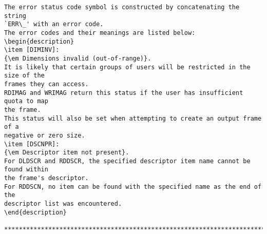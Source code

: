 \begin{verbatim}
The error status code symbol is constructed by concatenating the string
`ERR\_' with an error code.
The error codes and their meanings are listed below:
\begin{description}
\item [DIMINV]:
{\em Dimensions invalid (out-of-range)}.
It is likely that certain groups of users will be restricted in the size of the
frames they can access.
RDIMAG and WRIMAG return this status if the user has insufficient quota to map
the frame.
This status will also be set when attempting to create an output frame of a
negative or zero size.
\item [DSCNPR]:
{\em Descriptor item not present}.
For DLDSCR and RDDSCR, the specified descriptor item name cannot be found within
the frame's descriptor.
For RDDSCN, no item can be found with the specified name as the end of the
descriptor list was encountered.
\end{description}

********************************************************************************


\end{verbatim}
